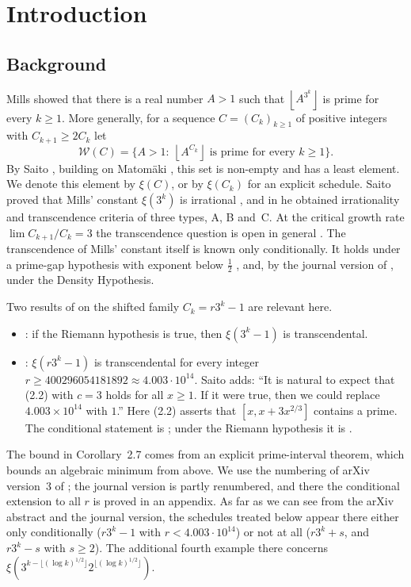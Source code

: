 \documentclass[11pt,a4paper]{article}
\theoremstyle{definition}
\theoremstyle{remark}
\newcommand{\floor}[1]{\left\lfloor #1\right\rfloor}
\begin{document}
\tableofcontents

\section{Introduction}\label{sec:intro}

\subsection{Background}
Mills \cite{Mil47} showed that there is a real number $A>1$ such that $\floor{A^{3^k}}$ is prime for every $k\ge1$.
More generally, for a sequence $C=(C_k)_{k\ge1}$ of positive integers with $C_{k+1}\ge2C_k$ let
\[
 \mathcal W(C)=\{A>1:\ \floor{A^{C_k}}\text{ is prime for every }k\ge1\}.
\]
By Saito \cite[Theorem~1.2]{SaiVar}, building on Matom\"aki \cite{Mat10}, this set is non-empty and has a least element. We denote this element by $\xi(C)$, or by $\xi(C_k)$ for an explicit schedule.
Saito proved that Mills' constant $\xi(3^k)$ is irrational \cite{SaiIrr}, and in \cite{SaiVar} he obtained irrationality and transcendence criteria of three types, A, B and~C.
At the critical growth rate $\lim C_{k+1}/C_k=3$ the transcendence question is open in general \cite[Table~1]{SaiVar}.
The transcendence of Mills' constant itself is known only conditionally. It holds under a prime-gap hypothesis with exponent below $\frac12$ \cite[Proposition~5.2]{SaiIrr}, and, by the journal version of \cite{SaiVar}, under the Density Hypothesis.

Two results of \cite{SaiVar} on the shifted family $C_k=r3^k-1$ are relevant here.
\begin{itemize}
\item \cite[Theorem~1.1]{SaiVar}: if the Riemann hypothesis is true, then $\xi(3^k-1)$ is transcendental.
\item \cite[Corollary~2.7]{SaiVar}: $\xi(r3^k-1)$ is transcendental for every integer $r\ge400296054181892\approx4.003\cdot10^{14}$.
Saito adds: ``It is natural to expect that (2.2) with $c=3$ holds for all $x\ge1$. If it were true, then we could replace $4.003\times10^{14}$ with $1$.'' Here (2.2) asserts that $[x,x+3x^{2/3}]$ contains a prime.
The conditional statement is \cite[Corollary~2.8]{SaiVar}; under the Riemann hypothesis it is \cite[Theorem~1.4(C)]{SaiVar}.
\end{itemize}
The bound in Corollary~2.7 comes from an explicit prime-interval theorem, which bounds an algebraic minimum from above.
We use the numbering of arXiv version~3 of \cite{SaiVar}; the journal version is partly renumbered, and there the conditional extension to all $r$ is proved in an appendix.
As far as we can see from the arXiv abstract and the journal version, the schedules treated below appear there either only conditionally ($r3^k-1$ with $r<4.003\cdot10^{14}$) or not at all ($r3^k+s$, and $r3^k-s$ with $s\ge2$). The additional fourth example there concerns $\xi(3^{k-\lfloor(\log k)^{1/2}\rfloor}2^{\lfloor(\log k)^{1/2}\rfloor})$.
\end{document}
